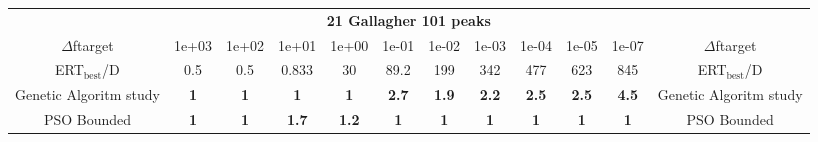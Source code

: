 \begin{tabular}{cccccccccccc}
 & \multicolumn{10}{c}{{\normalsize \textbf{21 Gallagher 101 peaks}}}\\
$\Delta$ftarget& 1e+03& 1e+02& 1e+01& 1e+00& 1e-01& 1e-02& 1e-03& 1e-04& 1e-05& 1e-07 & $\Delta$ftarget \\
ERT$_{\textrm{best}}$/D& 0.5& 0.5& 0.833& 30& 89.2& 199& 342& 477& 623& 845 & ERT$_{\textrm{best}}$/D \\
\hline
Genetic Algoritm study & \textbf{1} & \textbf{1} & \textbf{1} & \textbf{1} & \textbf{2.7} & \textbf{1.9} & \textbf{2.2} & \textbf{2.5} & \textbf{2.5} & \textbf{4.5} & Genetic Algoritm study \cite{add_an_entry_for_Genetic Algoritm study_in_bbob.bib}\\
PSO Bounded & \textbf{1} & \textbf{1} & \textbf{1.7} & \textbf{1.2} & \textbf{1} & \textbf{1} & \textbf{1} & \textbf{1} & \textbf{1} & \textbf{1} & PSO Bounded \cite{add_an_entry_for_PSO Bounded_in_bbob.bib}
\end{tabular}
